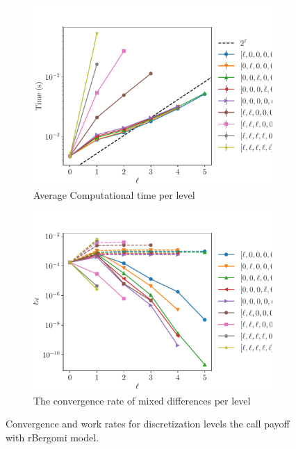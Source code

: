 \documentclass[11pt]{article}
\begin{document}
\begin{figure}[!h]
	\centering
	\begin{subfigure}{.5\textwidth}
		\centering
		\includegraphics[width=0.95\linewidth]{./figures/rbergomi_8_steps_K_1_2/level_work.pdf}
		\caption{Average Computational time per level}
		\label{fig:misc_rbergomi_8_steps_K_1_2_sub3}
	\end{subfigure}%
	\begin{subfigure}{.5\textwidth}
		\centering
		\includegraphics[width=0.95\linewidth]{./figures/rbergomi_8_steps_K_1_2/levels_error_rate.pdf}
		\caption{  The convergence rate of mixed differences per level}
		\label{fig:misc_rbergomi_8_steps_K_1_2_sub4}
	\end{subfigure}%
	\caption{Convergence and work rates for discretization levels  the call payoff with rBergomi model.}
	\label{fig:misc_rbergomi_8_steps_K_1_2_2}
\end{figure}
\end{document}
